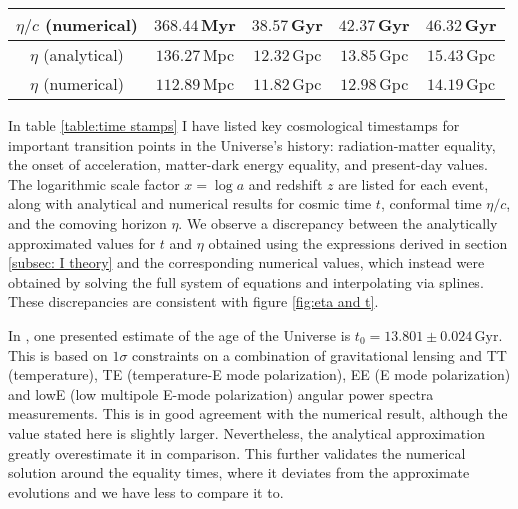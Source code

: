 \documentclass{aa}
\begin{document}
\begin{table*}
\begin{tabular}{| c || c | c | c | c |}
     $\eta/c$ (numerical) & \hspace{25pt}$368.44\,$Myr & \hspace{20.5pt}$38.57\,$Gyr & \hspace{19pt}$42.37\,$Gyr & \hspace{25pt}$46.32\,$Gyr \\ 
     \hline 
     \hspace{5.5pt}$\eta$ \hspace{3.5pt}(analytical) & \hspace{25pt}$136.27\,$Mpc & \hspace{20.5pt}$12.32\,$Gpc & \hspace{19pt}$13.85\,$Gpc & \hspace{25pt}$15.43\,$Gpc \\ 
     \hspace{5.5pt}$\eta$ \hspace{3.5pt}(numerical) & \hspace{25pt}$112.89\,$Mpc & \hspace{20.5pt}$11.82\,$Gpc & \hspace{19pt}$12.98\,$Gpc & \hspace{25pt}$14.19\,$Gpc \\ 
  \hline                                   %
  \end{tabular}
  \end{table*}

In table \ref{table:time stamps} I have listed key cosmological timestamps for important transition points in the Universe's history: radiation-matter equality, the onset of acceleration, matter-dark energy equality, and present-day values. The logarithmic scale factor $x = \log a$ and redshift $z$ are listed for each event, along with analytical and numerical results for cosmic time $t$, conformal time $\eta/c$, and the comoving horizon $\eta$. We observe a discrepancy between the analytically approximated values for $t$ and $\eta$ obtained using the expressions derived in section \ref{subsec: I theory} and the corresponding numerical values, which instead were obtained by solving the full system of equations and interpolating via splines. These discrepancies are consistent with figure \ref{fig:eta and t}.

In \citet{Planck}, one presented estimate of the age of the Universe is $t_0=13.801\pm0.024\,\text{Gyr}$. This is based on $1\sigma$ constraints on a combination of gravitational lensing and TT (temperature), TE (temperature-E mode polarization), EE (E mode polarization) and lowE (low multipole E-mode polarization) angular power spectra measurements. This is in good agreement with the numerical result, although the value stated here is slightly larger. Nevertheless, the analytical approximation greatly overestimate it in comparison. This further validates the numerical solution around the equality times, where it deviates from the approximate evolutions and we have less to compare it to.
\end{document}
